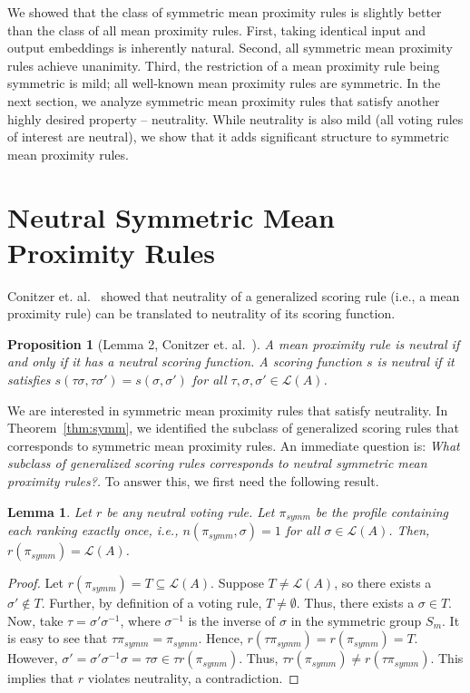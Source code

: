 \documentclass[10pt,letterpaper]{article}
\newcommand{\calL}{{\mathcal{L}}}
\newcommand{\rank}{{\calL(A)}}
\newtheorem{lemma}{Lemma}
\newtheorem{proposition}{Proposition}
\begin{document}

We showed that the class of symmetric mean proximity rules is slightly better than the class of all mean proximity rules. First, taking identical input and output embeddings is inherently natural. Second, all symmetric mean proximity rules achieve unanimity. Third, the restriction of a mean proximity rule being symmetric is mild; all well-known mean proximity rules are symmetric. In the next section, we analyze symmetric mean proximity rules that satisfy another highly desired property -- neutrality. While neutrality is also mild (all voting rules of interest are neutral), we show that it adds significant structure to symmetric mean proximity rules. 


\section{Neutral Symmetric Mean Proximity Rules}

Conitzer et. al.~\cite{CRX09} showed that neutrality of a generalized scoring rule (i.e., a mean proximity rule) can be translated to neutrality of its scoring function.
\begin{proposition}[Lemma 2, Conitzer et. al.~\cite{CRX09}]
A mean proximity rule is neutral if and only if it has a neutral scoring function. A scoring function $s$ is neutral if it satisfies $s(\tau \sigma,\tau \sigma') = s(\sigma,\sigma')$ for all $\tau, \sigma, \sigma' \in \rank$.
\label{prop:gsr-neutral}
\end{proposition}

We are interested in symmetric mean proximity rules that satisfy neutrality. In Theorem~\ref{thm:symm}, we identified the subclass of generalized scoring rules that corresponds to symmetric mean proximity rules. An immediate question is: \emph{What subclass of generalized scoring rules corresponds to neutral symmetric mean proximity rules?.} To answer this, we first need the following result.

\begin{lemma}
Let $r$ be any neutral voting rule. Let $\pi_{symm}$ be the profile containing each ranking exactly once, i.e., $n(\pi_{symm},\sigma) = 1$ for all $\sigma \in \rank$. Then, $r(\pi_{symm}) = \rank$. 
\label{lem:average-profile}
\end{lemma}
\begin{proof}
Let $r(\pi_{symm}) = T \subseteq \rank$. Suppose $T \neq \rank$, so there exists a $\sigma' \notin T$. Further, by definition of a voting rule, $T \neq \emptyset$. Thus, there exists a $\sigma \in T$. Now, take $\tau = \sigma' \sigma^{-1}$, where $\sigma^{-1}$ is the inverse of $\sigma$ in the symmetric group $S_m$. It is easy to see that $\tau \pi_{symm} = \pi_{symm}$. Hence, $r(\tau \pi_{symm}) = r(\pi_{symm}) = T$. However, $\sigma' = \sigma' \sigma^{-1} \sigma = \tau \sigma \in \tau r(\pi_{symm})$. Thus, $\tau r(\pi_{symm}) \neq r(\tau \pi_{symm})$. This implies that $r$ violates neutrality, a contradiction. 
\end{proof}
\end{document}
